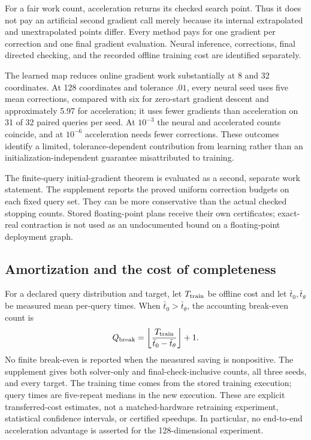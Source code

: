 For a fair work count, acceleration returns its checked search point. Thus it does not pay an artificial second gradient call merely because its internal extrapolated and unextrapolated points differ. Every method pays for one gradient per correction and one final gradient evaluation. Neural inference, corrections, final directed checking, and the recorded offline training cost are identified separately.


The learned map reduces online gradient work substantially at 8 and 32 coordinates. At 128 coordinates and tolerance $.01$, every neural seed uses five mean corrections, compared with six for zero-start gradient descent and approximately 5.97 for acceleration; it uses fewer gradients than acceleration on 31 of 32 paired queries per seed. At $10^{-3}$ the neural and accelerated counts coincide, and at $10^{-6}$ acceleration needs fewer corrections. These outcomes identify a limited, tolerance-dependent contribution from learning rather than an initialization-independent guarantee misattributed to training.

The finite-query initial-gradient theorem is evaluated as a second, separate work statement. The supplement reports the proved uniform correction budgets on each fixed query set. They can be more conservative than the actual checked stopping counts. Stored floating-point plans receive their own certificates; exact-real contraction is not used as an undocumented bound on a floating-point deployment graph.

\subsection{Amortization and the cost of completeness}
For a declared query distribution and target, let $T_{\rm train}$ be offline cost and let $\bar t_0,\bar t_\theta$ be measured mean per-query times. When $\bar t_0>\bar t_\theta$, the accounting break-even count is
\[
 Q_{\rm break}=\left\lfloor\frac{T_{\rm train}}{\bar t_0-\bar t_\theta}\right\rfloor+1.
\]
No finite break-even is reported when the measured saving is nonpositive. The supplement gives both solver-only and final-check-inclusive counts, all three seeds, and every target. The training time comes from the stored training execution; query times are five-repeat medians in the new execution. These are explicit transferred-cost estimates, not a matched-hardware retraining experiment, statistical confidence intervals, or certified speedups. In particular, no end-to-end acceleration advantage is asserted for the 128-dimensional experiment.


